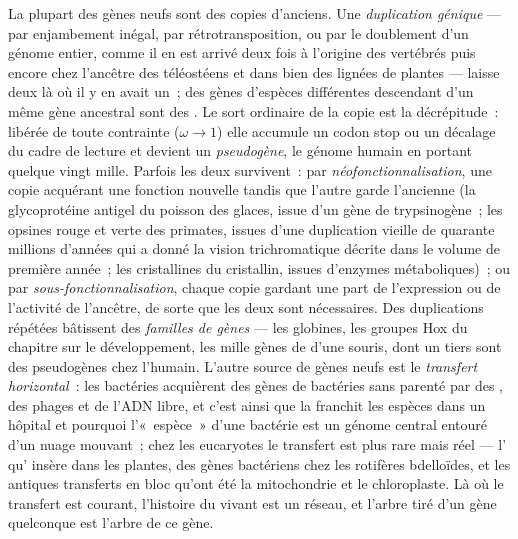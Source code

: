 \begin{definition}\label{def:b3:molecular-evolution:duplication}
La plupart des gènes neufs sont des copies d'anciens. Une
\emph{duplication génique} --- par enjambement inégal, par
rétrotransposition, ou par le doublement d'un génome entier, comme il en
est arrivé deux fois à l'origine des vertébrés puis encore chez
l'ancêtre des téléostéens et dans bien des lignées de plantes --- laisse
deux  là où il y en avait un~; des gènes d'espèces
différentes descendant d'un même gène ancestral sont des
. Le sort ordinaire de la copie est la décrépitude~:
libérée de toute contrainte ($\omega \to 1$) elle accumule un codon stop
ou un décalage du cadre de lecture et devient un \emph{pseudogène}, le
génome humain en portant quelque vingt mille. Parfois les deux
survivent~: par \emph{néofonctionnalisation}, une copie acquérant une
fonction nouvelle tandis que l'autre garde l'ancienne (la glycoprotéine
antigel du poisson des glaces, issue d'un gène de trypsinogène~; les
opsines rouge et verte des primates, issues d'une duplication vieille de
quarante millions d'années qui a donné la vision trichromatique décrite
dans le volume de première année~; les cristallines du cristallin,
issues d'enzymes métaboliques)~; ou par \emph{sous-fonctionnalisation},
chaque copie gardant une part de l'expression ou de l'activité de
l'ancêtre, de sorte que les deux sont nécessaires. Des duplications
répétées bâtissent des \emph{familles de gènes} --- les globines, les
groupes Hox du chapitre sur le développement, les mille gènes de
 d'une souris, dont un tiers sont des pseudogènes
chez l'humain. L'autre source de gènes neufs est le \emph{transfert
horizontal}~: les bactéries acquièrent des gènes de bactéries sans
parenté par des , des phages et de l'ADN libre, et c'est ainsi
que la  franchit les espèces dans un hôpital
et pourquoi l'«~espèce~» d'une bactérie est un génome central entouré
d'un nuage mouvant~; chez les eucaryotes le transfert est plus rare mais
réel --- l' qu'\emph{} insère dans les plantes, des
gènes bactériens chez les rotifères bdelloïdes, et les antiques
transferts en bloc qu'ont été la mitochondrie et le chloroplaste. Là où
le transfert est courant, l'histoire du vivant est un réseau, et l'arbre
tiré d'un gène quelconque est l'arbre de ce gène.
\end{definition}

